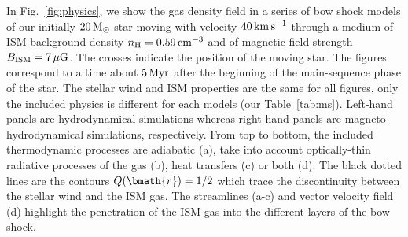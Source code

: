 \documentclass[useAMS,usenatbib]{mn2e}
\begin{document}
In Fig.~\ref{fig:physics}, we show the gas density field in a series of bow
shock models of our initially $20\, \rm M_{\odot}$ star moving with velocity
$40\, \rm km\, \rm s^{-1}$ through a medium of ISM background density $n_{\rm
H}=0.59\, \rm cm^{-3}$ and of magnetic field strength $B_{\rm ISM}=7\, \mu \rm
G$. The crosses indicate the position of the moving star. 
The figures correspond to a time about $5\, \rm Myr$ after the beginning of
the main-sequence phase of the star. The stellar wind and ISM properties are
the same for all figures, only the included physics is different for each models
(our Table~\ref{tab:ms}). Left-hand panels are hydrodynamical simulations whereas  
right-hand panels are magneto-hydrodynamical simulations, respectively. 
From top to bottom, the included thermodynamic processes are adiabatic (a), 
take into account optically-thin radiative processes of the gas (b), heat 
transfers (c) or both (d). The black dotted lines are the contours 
$Q(\bmath{r})=1/2$ which trace the discontinuity between the stellar wind 
and the ISM gas. The streamlines (a-c) and vector velocity field (d) 
highlight the penetration of the ISM gas into the different layers 
of the bow shock. 
\end{document}
